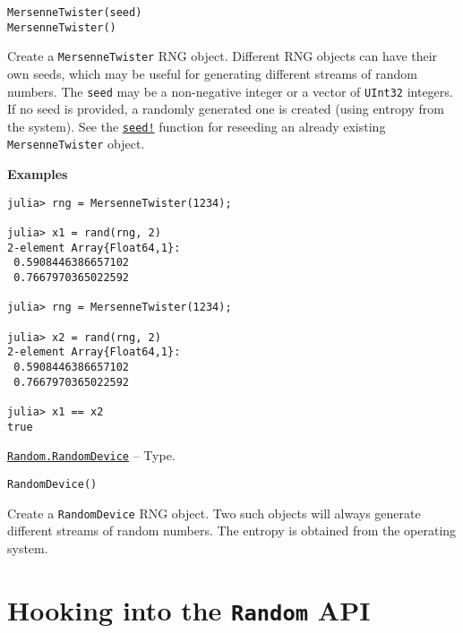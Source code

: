 \begin{adjustwidth}{2em}{0pt}


\begin{verbatim}
MersenneTwister(seed)
MersenneTwister()
\end{verbatim}

Create a \texttt{MersenneTwister} RNG object. Different RNG objects can have their own seeds, which may be useful for generating different streams of random numbers. The \texttt{seed} may be a non-negative integer or a vector of \texttt{UInt32} integers. If no seed is provided, a randomly generated one is created (using entropy from the system). See the \hyperlink{9373195541397142847}{\texttt{seed!}} function for reseeding an already existing \texttt{MersenneTwister} object.

\textbf{Examples}


\begin{verbatim}
julia> rng = MersenneTwister(1234);

julia> x1 = rand(rng, 2)
2-element Array{Float64,1}:
 0.5908446386657102
 0.7667970365022592

julia> rng = MersenneTwister(1234);

julia> x2 = rand(rng, 2)
2-element Array{Float64,1}:
 0.5908446386657102
 0.7667970365022592

julia> x1 == x2
true
\end{verbatim}



\end{adjustwidth}
\hypertarget{14367539717133476780}{} 
\hyperlink{14367539717133476780}{\texttt{Random.RandomDevice}}  -- {Type.}

\begin{adjustwidth}{2em}{0pt}


\begin{verbatim}
RandomDevice()
\end{verbatim}

Create a \texttt{RandomDevice} RNG object. Two such objects will always generate different streams of random numbers. The entropy is obtained from the operating system.



\end{adjustwidth}

\hypertarget{17771818288641906623}{}


\section{Hooking into the \texttt{Random} API}



